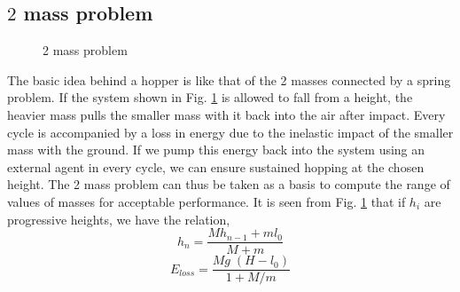\subsection*{$2$ mass problem}
\begin{figure}[!htp]
\centering
{}
\caption[2 mass problem]{2 mass problem \cite{simit}}
\label{fig:3_2mass}
\end{figure}
The basic idea behind a hopper is like that of the 2 masses connected by a spring problem. If the system shown in Fig.
\ref{fig:3_2mass} is allowed to fall from a height, the heavier mass pulls the smaller mass with it back into the air
after impact. Every cycle is accompanied by a loss in energy due to the inelastic impact of the smaller mass with the
ground. If we pump this energy back into the system using an external agent in every cycle, we can ensure sustained hopping at the chosen height. The 2 mass problem can thus be taken as a basis to compute the range of values of masses for acceptable performance. It is seen from Fig. \ref{fig:3_2mass} that if $h_i$ are progressive heights, we have the relation,
\begin{equation}
h_n = \frac{Mh_{n-1} + ml_0}{M + m}
\end{equation}
\begin{equation}
\label{eqn:3_eloss}
E_{loss} = \frac{Mg\;(H-l_0)}{1 + M/m}
\end{equation}
